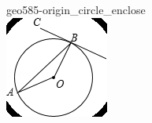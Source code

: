 \documentclass[12pt]{article}
\begin{document}
\begin{center}
\begin{minipage}{0.32\textwidth}
\end{minipage}
\hfill\begin{minipage}{0.32\textwidth}\centering
geo585-origin\_circle\_enclose\\
\includegraphics[width=0.95\linewidth]{out_rommath_origin/items/geo585-origin/assets/figure_circle.png}
\end{minipage}
\par
\end{center}
\bigskip
\end{document}
